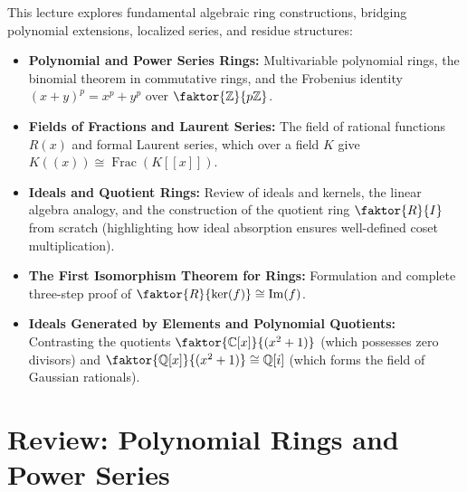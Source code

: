 

\begin{overview}
This lecture explores fundamental algebraic ring constructions, bridging polynomial extensions, localized series, and residue structures:
\begin{itemize}
    \item \textbf{Polynomial and Power Series Rings:} Multivariable polynomial rings, the binomial theorem in commutative rings, and the Frobenius identity $(x+y)^p = x^p + y^p$ over $\faktor{\mathbb{Z}}{p\mathbb{Z}}$.
    \item \textbf{Fields of Fractions and Laurent Series:} The field of rational functions $R(x)$ and formal Laurent series, which over a field $K$ give $K((x)) \cong \operatorname{Frac}(K[[x]])$.
    \item \textbf{Ideals and Quotient Rings:} Review of ideals and kernels, the linear algebra analogy, and the construction of the quotient ring $\faktor{R}{I}$ from scratch (highlighting how ideal absorption ensures well-defined coset multiplication).
    \item \textbf{The First Isomorphism Theorem for Rings:} Formulation and complete three-step proof of $\faktor{R}{\ker(f)} \cong \operatorname{Im}(f)$.
    \item \textbf{Ideals Generated by Elements and Polynomial Quotients:} Contrasting the quotients $\faktor{\mathbb{C}[x]}{(x^2+1)}$ (which possesses zero divisors) and $\faktor{\mathbb{Q}[x]}{(x^2+1)} \cong \mathbb{Q}[i]$ (which forms the field of Gaussian rationals).
\end{itemize}
\end{overview}

\section{Review: Polynomial Rings and Power Series}

